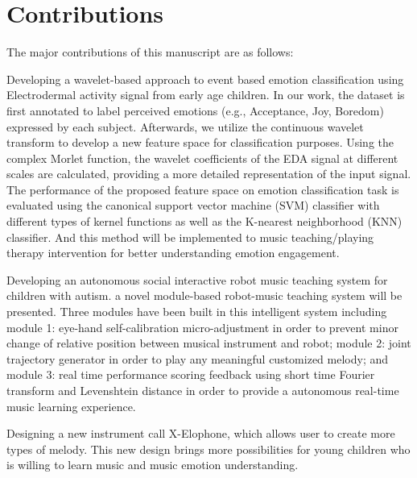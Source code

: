 
\section{Contributions}
The major contributions of this manuscript are as follows:
\bi
\item 
Developing a wavelet-based approach to event based emotion classification
using Electrodermal activity signal from early age children. In our work, 
the dataset is first annotated to label perceived emotions (e.g., Acceptance, 
Joy, Boredom) expressed by each subject. Afterwards, we utilize the continuous 
wavelet transform to develop a new feature space for classification purposes. 
Using the complex Morlet function, the wavelet coefficients of the EDA signal 
at different scales are calculated, providing a more detailed representation of 
the input signal. The performance of the proposed feature space on emotion 
classification task is evaluated using the canonical support vector machine 
(SVM) classifier with different types of kernel functions as well as the 
K-nearest neighborhood (KNN) classifier. And this method will be
implemented to music teaching/playing therapy intervention for better
understanding emotion engagement.\\

\item 
Developing an autonomous social interactive robot music teaching system
for children with autism. a novel module-based robot-music teaching system will be presented. 
Three modules have been built in this intelligent system including module 1: eye-hand 
self-calibration micro-adjustment in order to prevent minor change of relative position
between musical instrument and robot; module 2: joint trajectory generator in order to 
play any meaningful customized melody; and module 3: real time performance scoring 
feedback using short time Fourier transform and Levenshtein distance in order to provide
a autonomous real-time music learning experience.\\

\item 
Designing a new instrument call X-Elophone, which allows user to create
more types of melody. This new design brings more possibilities for young
children who is willing to learn music and music emotion understanding.\\


